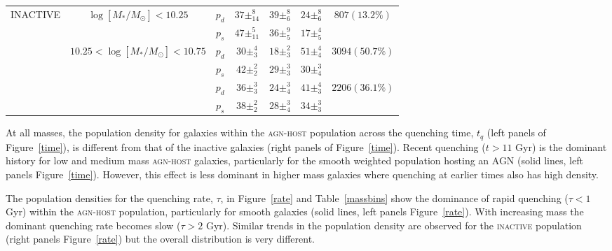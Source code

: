 \begin{table}
{{\begin{tabular}{c|c|c|c|c|c|c}
\multirow{6}{*}{INACTIVE}  & \multirow{2}{*}{$\log [M_*/M_{\odot}] < 10.25 $}                       & $p_d$     & $37\pm_{14}^{8}$                    & $39\pm_{6}^{8}$                    & $24\pm_{6}^{8}$        & \multirow{2}{*}{$807 (13.2\%)$}                      \\
                           &                                                 & $p_s$     & $47\pm_{11}^{5}$                    & $36\pm_{5}^{9}$                    & $17\pm_{5}^{4}$        &                                                      \\ \cline{2-7} 
                           & \multirow{2}{*}{$10.25 < \log [M_*/M_{\odot}] < 10.75$}                    & $p_d$     &          $30\pm_{3}^{4}$                          &       $18\pm_{3}^{2}$                            &    $51\pm_{4}^{4}$                   & \multirow{2}{*}{$3094 (50.7\%)$}                     \\
                           &                                                 & $p_s$     & $42\pm_{2}^{2}$            & $29\pm_{3}^{3}$   & $30\pm_{4}^{3}$ &                                                      \\ \cline{2-7} 
                           & {\multirow{2}{*}{$\log [M_*/M_{\odot}] > 10.75$}} & $p_d$     & $36\pm_{3}^{3}$            & $24\pm_{4}^{3}$         & $41\pm_{3}^{4}$ & \multicolumn{1}{l}{\multirow{2}{*}{$2206 (36.1\%)$}} \\
                           & \multicolumn{1}{l|}{}                           & $p_s$      & $38\pm_{2}^{2}$              & $28\pm_{4}^{3}$            & $34\pm_{3}^{3}$ & \multicolumn{1}{l}{}                                 \\ \hline                       
\end{tabular}}}
\end{table}

At all masses, the population density for galaxies within the \textsc{agn-host} population across the quenching time, $t_q$ (left panels of Figure~\ref{time}), is different from that of the inactive galaxies (right panels of Figure~\ref{time}). Recent quenching ($t > 11$ Gyr) is the dominant history for low and medium mass \textsc{agn-host} galaxies, particularly for the smooth weighted population hosting an AGN (solid lines, left panels Figure~\ref{time}). However, this effect is less dominant in higher mass galaxies where quenching at earlier times also has high density.


The population densities for the quenching rate, $\tau$, in Figure~\ref{rate} and Table~\ref{massbins} show the dominance of rapid quenching ($\tau < 1$ Gyr) within the \textsc{agn-host} population, particularly for smooth galaxies (solid lines, left panels Figure~\ref{rate}). With increasing mass the dominant quenching rate becomes slow ($\tau > 2$ Gyr). Similar trends in the population density are observed for the \textsc{inactive} population (right panels Figure~\ref{rate}) but the overall distribution is very different. 

